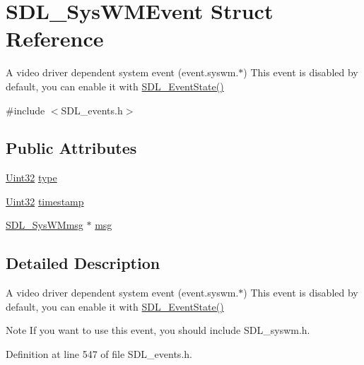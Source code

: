 \hypertarget{struct_s_d_l___sys_w_m_event}{}\section{S\+D\+L\+\_\+\+Sys\+W\+M\+Event Struct Reference}
\label{struct_s_d_l___sys_w_m_event}


A video driver dependent system event (event.\+syswm.$\ast$) This event is disabled by default, you can enable it with \mbox{\hyperlink{_s_d_l__events_8h_afb772893e1c46f186fa39a4defe76df3}{S\+D\+L\+\_\+\+Event\+State()}}  




{\ttfamily \#include $<$S\+D\+L\+\_\+events.\+h$>$}

\subsection*{Public Attributes}
\begin{DoxyCompactItemize}
\item 
\mbox{\hyperlink{_s_d_l__stdinc_8h_add440eff171ea5f55cb00c4a9ab8672d}{Uint32}} \mbox{\hyperlink{struct_s_d_l___sys_w_m_event_a84697e96cb16bf6a570e10b5bfdcd392}{type}}
\item 
\mbox{\hyperlink{_s_d_l__stdinc_8h_add440eff171ea5f55cb00c4a9ab8672d}{Uint32}} \mbox{\hyperlink{struct_s_d_l___sys_w_m_event_a5d3cb97006d99b620c2671c27bd82c06}{timestamp}}
\item 
\mbox{\hyperlink{struct_s_d_l___sys_w_mmsg}{S\+D\+L\+\_\+\+Sys\+W\+Mmsg}} $\ast$ \mbox{\hyperlink{struct_s_d_l___sys_w_m_event_ad5e3dc68aa15582cd0641847d41c74e8}{msg}}
\end{DoxyCompactItemize}


\subsection{Detailed Description}
A video driver dependent system event (event.\+syswm.$\ast$) This event is disabled by default, you can enable it with \mbox{\hyperlink{_s_d_l__events_8h_afb772893e1c46f186fa39a4defe76df3}{S\+D\+L\+\_\+\+Event\+State()}} 

\begin{DoxyNote}{Note}
If you want to use this event, you should include S\+D\+L\+\_\+syswm.\+h. 
\end{DoxyNote}


Definition at line 547 of file S\+D\+L\+\_\+events.\+h.



